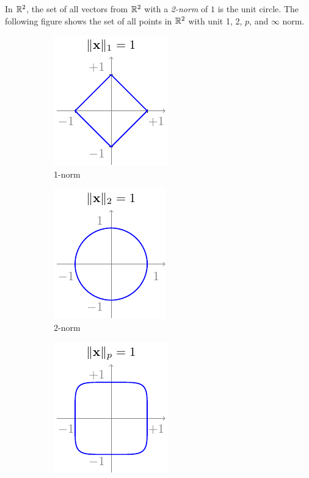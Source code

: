 In $\mathbb{R}^2$, the set of all vectors from $\mathbb{R}^2$ with a \textit{2-norm} of $1$ is the unit circle. The following figure shows the set of all points in $\mathbb{R}^2$ with unit 1, 2, $p$, and $\infty$ norm.
\begin{figure}[h]
    \centering
    \begin{subfigure}[b]{0.24\textwidth}
        \includegraphics{figure/chapter01/norm1.pdf}
        \caption{1-norm}
        \label{fig:norm1}
    \end{subfigure}
    \begin{subfigure}[b]{0.24\textwidth}
        \centering
        \includegraphics{figure/chapter01/norm2.pdf}
        \caption{2-norm}
        \label{fig:norm2}
    \end{subfigure}
    \begin{subfigure}[b]{0.24\textwidth}
        \centering
        \includegraphics{figure/chapter01/normp.pdf}

\end{subfigure}
\end{figure}
